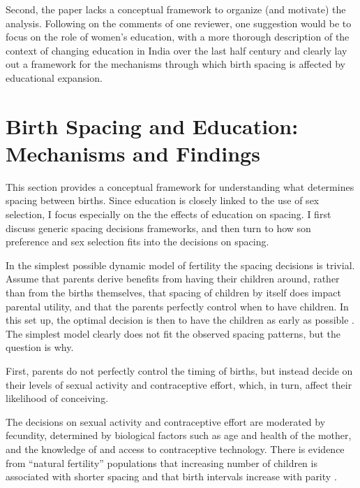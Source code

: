 Second, the paper lacks a conceptual framework to organize (and
motivate) the analysis. Following on the comments of one reviewer, one
suggestion would be to focus on the role of women’s education, with a
more thorough description of the context of changing education in India
over the last half century and clearly lay out a framework for the
mechanisms through which birth spacing is affected by educational
expansion.

\section{Birth Spacing and Education: Mechanisms and Findings}

This section provides a conceptual framework for understanding what determines spacing 
between births.
Since education is closely linked to the use of sex selection, I focus especially on the
the effects of education on spacing.
I first discuss generic spacing decisions frameworks, and then turn to how son preference
and sex selection fits into the decisions on spacing.

In the simplest possible dynamic model of fertility the spacing decisions is trivial.
Assume that parents derive benefits from having their children around, rather than from 
the births themselves, that spacing of children by itself does impact parental utility, 
and that the parents perfectly control when to have children. 
In this set up, the optimal decision is then to have the children as early as possible 
\citep{Newman1988}.
The simplest model clearly does not fit the observed spacing patterns, but the question 
is why.

First, parents do not perfectly control the timing of births, but instead decide on their
levels of sexual activity and contraceptive effort, which, in turn, affect their likelihood 
of conceiving.

The decisions on sexual activity and contraceptive effort are moderated by fecundity,
determined by biological factors such as age and health of the mother, and the knowledge of and 
access to contraceptive technology.
There is evidence from ``natural fertility'' populations that increasing number of 
children is associated with shorter spacing and that birth intervals increase 
with parity \citep{Henry1961,Leridon1977}.

